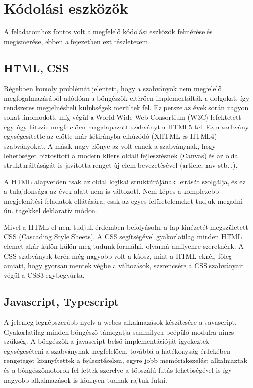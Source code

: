 \chapter{Kódolási eszközök}\label{sect:CodeTool}

\hspace{2mm} A feladatomhoz fontos volt a megfelelő kódolási eszközök felmérése és megismerése, ebben a fejezetben ezt részletezem. 

\section{HTML, CSS}
\hspace{2mm} Régebben komoly problémát jelentett, hogy a szabványok nem megfelelő megfogalmazásából adódóan a böngészők eltérően implementálták a dolgokat, így rendszeres megjelnésbeli külnbségek merültek fel. Ez persze az évek során nagyon sokat finomodott, míg végül a World Wide Web Consortium (W3C) lefektetett egy úgy látszik megfelelően magalapozott szabványt a HTML5-tel. Ez a szabvány egységesítette az előtte már kétirányba elhúzódó (XHTML és HTML4) szabványokat. A másik nagy előnye az volt ennek a szabványnak, hogy lehetőséget biztosított a modern kliens oldali fejlesztésnek (Canvas) és az oldal strukturáltáságát is javította renget új elem bevezetésével (article, nav stb...).

A HTML alapvetően csak az oldal logikai struktúrájának leírását szolgálja, és ez a tulajdonsága az évek alatt nem is változott. Nem képes a komplexebb megjelenítési feladatok ellátására, csak az egyes felületelemeket tudjuk megadni ún. tagekkel deklaratív módon.

Mivel a HTML-el nem tudjuk érdemben befolyásolni a lap kinézetét megszületett CSS (Cascading Style Sheets). A CSS segítségével gyakorlatilag minden HTML elemet akár külön-külön meg tudunk formálni, olyanná amilyenre szeretnénk. A CSS szabványok terén még nagyobb volt a káosz, mint a HTML-eknél, főleg amiatt, hogy gyorsan mentek végbe a változások, szerencsére a CSS szabványait végül a CSS3 egybegyúrta.  

\section{Javascript, Typescript}
\hspace{2mm} A jelenleg legnépszerűbb nyelv a webes alkalmazások készítésére a Javascript. Gyakorlatilag minden böngésző támogatja semmilyen beépülő modulra nincs szükség. A böngészők a javascript belső implementációját igyekeztek egységeséteni a szabványnak megfelelően, továbbá a hatékonyság érdekében rengeteget könnyítettek a fejlesztéseken, egyre jobb memóriakezelést alkalmaztak és a böngészőmotorok fel lettek szerelve a töbszálú futás lehetőségével is így nagyobb alkalmazások is könnyen tudnak rajtuk futni.

